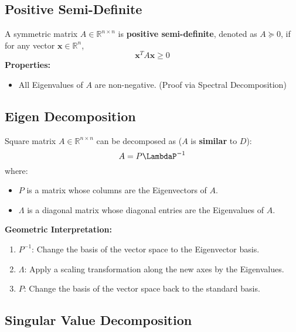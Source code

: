 \documentclass{article}
\begin{document}
\subsection{Positive Semi-Definite}
A symmetric matrix $A \in \mathbb{R}^{n \times n}$ is \textbf{positive semi-definite}, denoted as $A \succeq 0$, if for any vector $\mathbf{x} \in \mathbb{R}^n$,
\[
    \mathbf{x}^T A \mathbf{x} \geq 0
\]
\textbf{Properties:}
\begin{itemize}
    \item All Eigenvalues of $A$ are non-negative. (Proof via Spectral Decomposition)
\end{itemize}

\subsection{Eigen Decomposition}

Square matrix $A \in \mathbb{R}^{n \times n}$ can be decomposed as ($A$ is \textbf{similar} to $D$):
\[
    A = P \LambdaP ^{-1}
\]
where:
\begin{itemize}
    \item $P$ is a matrix whose columns are the Eigenvectors of $A$.
    \item $\Lambda$ is a diagonal matrix whose diagonal entries are the Eigenvalues of $A$.
\end{itemize}
\textbf{Geometric Interpretation:}
\begin{enumerate}
    \item $P^{-1}$: Change the basis of the vector space to the Eigenvector basis.
    \item $\Lambda$: Apply a scaling transformation along the new axes by the Eigenvalues.
    \item $P$: Change the basis of the vector space back to the standard basis.
\end{enumerate}

\subsection{Singular Value Decomposition}
\end{document}
